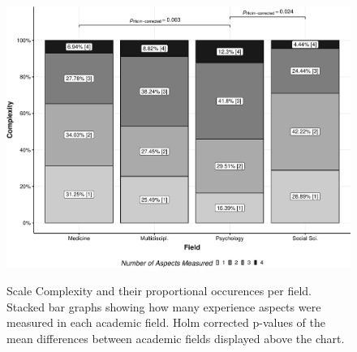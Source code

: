 \begin{figure}[h]
\centering
\caption{Scale Complexity and their proportional occurences per field. Stacked bar graphs showing how many experience aspects were measured in each academic field. Holm corrected p-values of the mean differences between academic fields displayed above the chart.}
\includegraphics[width=\textwidth]{Figures/FieldPlotComplexityAverage-1}
\label{fig:FieldPlotComplexityAverage}
\end{figure}

